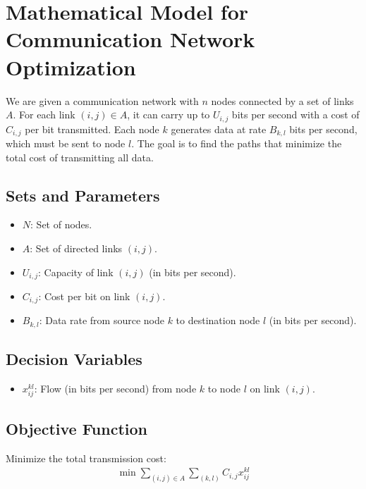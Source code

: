 \documentclass{article}
\begin{document}
\section*{Mathematical Model for Communication Network Optimization}

We are given a communication network with $n$ nodes connected by a set of links $A$. For each link $(i, j) \in A$, it can carry up to $U_{i,j}$ bits per second with a cost of $C_{i,j}$ per bit transmitted. Each node $k$ generates data at rate $B_{k,l}$ bits per second, which must be sent to node $l$. The goal is to find the paths that minimize the total cost of transmitting all data.

\subsection*{Sets and Parameters}
\begin{itemize}
    \item $N$: Set of nodes.
    \item $A$: Set of directed links $(i, j)$.
    \item $U_{i,j}$: Capacity of link $(i, j)$ (in bits per second).
    \item $C_{i,j}$: Cost per bit on link $(i, j)$.
    \item $B_{k,l}$: Data rate from source node $k$ to destination node $l$ (in bits per second).
\end{itemize}

\subsection*{Decision Variables}
\begin{itemize}
    \item $x_{ij}^{kl}$: Flow (in bits per second) from node $k$ to node $l$ on link $(i, j)$.
\end{itemize}

\subsection*{Objective Function}
Minimize the total transmission cost:
\begin{align*}
    \min \sum_{(i,j) \in A} \sum_{(k,l)} C_{i,j} x_{ij}^{kl}
\end{align*}
\end{document}
